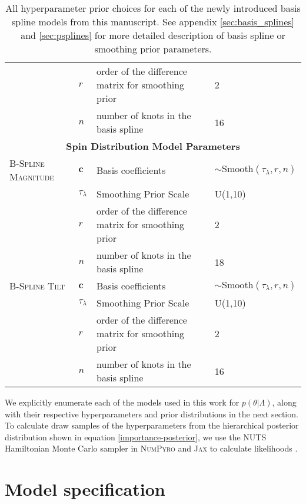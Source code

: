 \begin{table*}[hb!]
\begin{tabular}{|l|l|l|l|}
     & $r$ & order of the difference matrix for smoothing prior & 2 \\ \cline{2-4} 
     & $n$ & number of knots in the basis spline & 16 \\ \hline \hline 
    \multicolumn{4}{|c|}{\textbf{Spin Distribution Model Parameters}} \\ \hline
    \textsc{B-Spline Magnitude} & $\bm{c}$ &  Basis coefficients & $\sim \mathrm{Smooth}(\tau_\lambda, r, n)$  \\ \cline{2-4} 
    & $\tau_\lambda$ & Smoothing Prior Scale & U(1,10) \\ \cline{2-4}
    & $r$ & order of the difference matrix for smoothing prior & 2 \\ \cline{2-4} 
    & $n$ & number of knots in the basis spline & 18 \\ \hline \hline 
    \textsc{B-Spline Tilt} & $\bm{c}$ &  Basis coefficients & $\sim \mathrm{Smooth}(\tau_\lambda, r, n)$  \\ \cline{2-4} 
    & $\tau_\lambda$ & Smoothing Prior Scale & U(1,10) \\ \cline{2-4}
    & $r$ & order of the difference matrix for smoothing prior & 2 \\ \cline{2-4} 
    & $n$ & number of knots in the basis spline & 16 \\ \hline \hline
    \end{tabular}
    \caption{All hyperparameter prior choices for each of the newly introduced basis spline models from this manuscript. See appendix 
    \ref{sec:basis_splines} and \ref{sec:psplines} for more detailed description of basis spline or smoothing prior parameters.}
    \label{tab:model_priors}
\end{table*} 


We explicitly enumerate each of the models used in this work for $p(\theta|\Lambda)$, along with 
their respective hyperparameters and prior distributions in the next section. To calculate draw 
samples of the hyperparameters from the hierarchical posterior distribution shown in equation \ref{importance-posterior}, we use the 
NUTS Hamiltonian Monte Carlo sampler in \textsc{NumPyro} and \textsc{Jax} to calculate likelihoods \citep{jax,pyro,numpyro}.

\section{Model specification} \label{sec:modelpriors}

